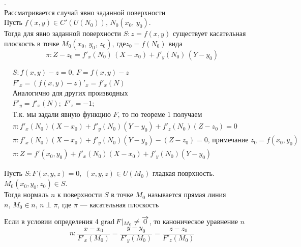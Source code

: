 		\begin{Th}.\\
            Рассматривается случай явно заданной поверхности\\
			Пусть $f(x, y) \in C'(U(N_0)), \, N_0(x_0,\, y_0)$.\\
			Тогда для явно заданной поверхности $S : z = f(x, y)$ существует касательная плоскость в точке $M_0(x_0,\, y_0,\, z_0), \, \text{где} z_0 = f(N_0)$ вида 
			\[
                \pi: Z-z_0 = f'_x(N_0)\,(X-x_0) + f'_y(N_0)\,(Y-y_0)
            \]
		\end{Th}
		\begin{Proof}
			\begin{align*}
				&S: f(x, y) - z = 0, \, F = f(x, y) - z\\
				&F'_x = (f(x, y) - z)'_x = f'_x(N) \\ 
				&\text{Аналогично для других производных}\\
				&F'_y = f'_x(N); \; F'_z = -1;\\
				&\text{Т.к. мы задали явную функцию $F$, то по теореме 1 получаем}\\
				&\pi : f'_x(N_0)(X-x_0) + f'_y(N_0)(Y-y_0) + f'_z(N_0)(Z-z_0) = 0 \\
				&\pi : f'_x(N_0)(X-x_0) + f'_y(N_0)(Y-y_0) - (Z-z_0) = 0 ,\, \text{примечание } z_0 = f(x_0, y_0)\\
				&\pi : Z = f'(x_0, y_0) + f'_x(N_0)(X-x_0) + f'_y(N_0)(Y-y_0)
			\end{align*}
		\end{Proof}
		
		\begin{Def}
			Пусть $S : F(x,y,z) = 0, \; (x, y, z) \in U(M_0)$ гладкая поврхность. $M_0(x_0, y_0, z_0) \in S$.\\
			Тогда нормаль $n$ к поверхности $S$ в точке $M_0$ называется прямая линия $n,\, M_0 \in n,\, n\perp\pi$, где $\pi$ --- касательная плоскость
		\end{Def}
		
		\begin{Note}
			Если в условии определения 4 $ \mathop{\mathrm{grad}} F |_{M_0} \neq \overrightarrow{0}$, то каноническое уравнение $n$
			\[
				n : \frac{x - x_0}{F'_x(M_0)} = \frac{y - y_0}{F'_y(M_0)} = \frac{z - z_0}{F'_z(M_0)}
			\] 
		\end{Note}
		